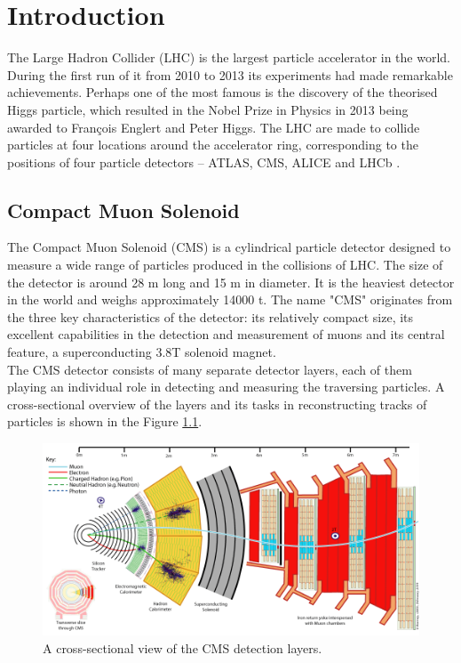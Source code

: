 \chapter{Introduction}
The Large Hadron Collider (LHC) is the largest particle accelerator in the world. During the first run of it from 2010 to 2013 its experiments had made remarkable achievements. Perhaps one of the most famous is the discovery of the theorised Higgs particle, which resulted in the Nobel Prize in Physics in 2013 being awarded to François Englert and Peter Higgs. The LHC are made to collide particles at four locations around the accelerator ring, corresponding to the positions of four particle detectors – ATLAS, CMS, ALICE and LHCb \cite{ref_cern_home}.


\section{Compact Muon Solenoid}

The Compact Muon Solenoid (CMS) is a cylindrical particle detector designed to measure a wide range of particles produced in the collisions of LHC. The size of the detector is around 28 m long and 15 m in diameter. It is the heaviest detector in the world and weighs approximately 14000 t. The name "CMS" originates from the three key characteristics of the detector: its relatively compact size, its excellent capabilities in the detection and measurement of muons and its central feature, a superconducting 3.8T solenoid magnet.\\
The CMS detector consists of many separate detector layers, each of them playing an individual role in detecting and measuring the traversing particles. A cross-sectional overview of the layers and its tasks in reconstructing tracks of particles is shown in the
Figure \ref{fig:cms_layers}.
\begin{figure}[ht]\centering
\includegraphics[width=0.8\linewidth]{Data/CMS_layers.png}
\caption{A cross-sectional view of the CMS detection layers.}
\label{fig:cms_layers}
\end{figure}

